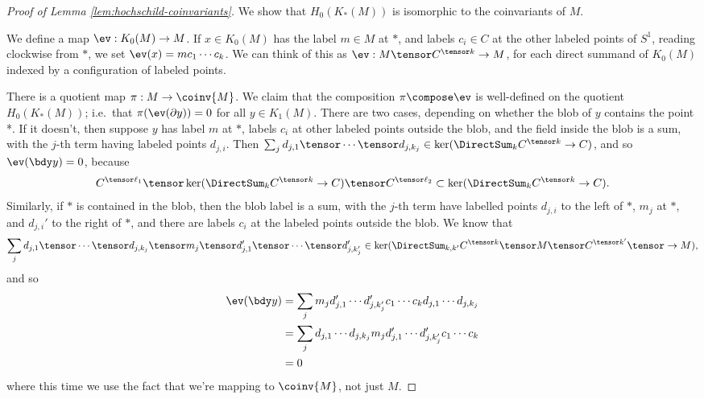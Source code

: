 \begin{proof}[Proof of Lemma \ref{lem:hochschild-coinvariants}]
We show that $H_0(K_*(M))$ is isomorphic to the coinvariants of $M$.

We define a map $\ev: K_0(M) \to M$. If $x \in K_0(M)$ has the label $m \in M$ at $*$, and labels $c_i \in C$ at the other labeled points of $S^1$, reading clockwise from $*$,
we set $\ev(x) = m c_1 \cdots c_k$. We can think of this as $\ev : M \tensor C^{\tensor k} \to M$, for each direct summand of $K_0(M)$ indexed by a configuration of labeled points.

There is a quotient map $\pi: M \to \coinv{M}$.
We claim that the composition $\pi \compose \ev$ is well-defined on the quotient $H_0(K_*(M))$; 
i.e.\ that $\pi(\ev(\bd y)) = 0$ for all $y \in K_1(M)$.
There are two cases, depending on whether the blob of $y$ contains the point *.
If it doesn't, then
suppose $y$ has label $m$ at $*$, labels $c_i$ at other labeled points outside the blob, and the field inside the blob is a sum, with the $j$-th term having
labeled points $d_{j,i}$. Then $\sum_j d_{j,1} \tensor \cdots \tensor d_{j,k_j} \in \ker(\DirectSum_k C^{\tensor k} \to C)$, and so
$\ev(\bdy y) = 0$, because $$C^{\tensor \ell_1} \tensor \ker(\DirectSum_k C^{\tensor k} \to C) \tensor C^{\tensor \ell_2} \subset \ker(\DirectSum_k C^{\tensor k} \to C).$$
Similarly, if $*$ is contained in the blob, then the blob label is a sum, with the $j$-th term have labelled points $d_{j,i}$ to the left of $*$, $m_j$ at $*$, and $d_{j,i}'$ to the right of $*$,
and there are labels $c_i$ at the labeled points outside the blob. We know that
$$\sum_j d_{j,1} \tensor \cdots \tensor d_{j,k_j} \tensor m_j \tensor d_{j,1}' \tensor \cdots \tensor d_{j,k'_j}' \in \ker(\DirectSum_{k,k'} C^{\tensor k} \tensor M \tensor C^{\tensor k'} \tensor \to M),$$
and so
\begin{align*}
\ev(\bdy y) & = \sum_j m_j d_{j,1}' \cdots d_{j,k'_j}' c_1 \cdots c_k d_{j,1} \cdots d_{j,k_j} \\
            & = \sum_j d_{j,1} \cdots d_{j,k_j} m_j d_{j,1}' \cdots d_{j,k'_j}' c_1 \cdots c_k \\
            & = 0
\end{align*}
where this time we use the fact that we're mapping to $\coinv{M}$, not just $M$.


\end{proof}
